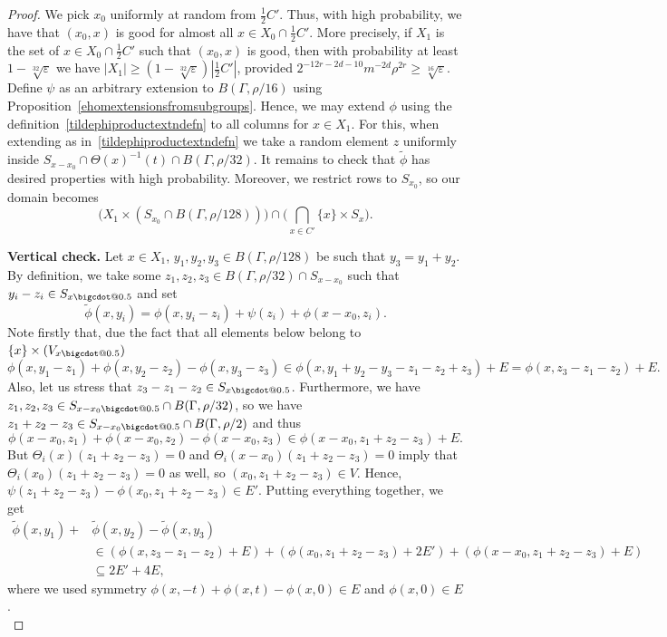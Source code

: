 \documentclass[a4paper,11pt]{article}
\makeatletter
\numberwithin{theorem}{section}
\theoremstyle{definition}
\newcommand*\bcdot{\mathpalette\bigcdot@{0.5}}
\newcommand*\bigcdot@[2]{\mathbin{\vcenter{\hbox{\scalebox{#2}{$\m@th#1\bullet$}}}}}
\makeatother
\begin{document}
\begin{proof}
    We pick $x_0$ uniformly at random from $\frac{1}{2}C'$. Thus, with high probability, we have that $(x_0, x)$ is good for almost all $x\in X_0 \cap \frac{1}{2}C'$. More precisely, if $X_1$ is the set of $x \in X_0 \cap \frac{1}{2}C'$ such that $(x_0, x)$ is good, then with probability at least $1-\sqrt[32]{\varepsilon}$ we have $|X_1| \geq (1 - \sqrt[32]{\varepsilon})|\frac{1}{2}C'|$, provided $2^{-12r - 2d-10}m^{-2d} \rho^{2r} \geq \sqrt[16]{\varepsilon}$. Define $\psi$ as an arbitrary extension to $B(\Gamma, \rho/16)$ using Proposition~\ref{ehomextensionsfromsubgroups}. Hence, we may extend $\phi$ using the definition~\eqref{tildephiproductextndefn} to all columns for $x \in X_1$. For this, when extending as in~\eqref{tildephiproductextndefn} we take a random element $z$ uniformly inside $S_{x - x_0} \cap \Theta(x)^{-1}(t) \cap B(\Gamma, \rho/32)$. It remains to check that $\tilde{\phi}$ has desired properties with high probability. Moreover, we restrict rows to $S_{x_0}$, so our domain becomes
    \[\Big(X_1 \times (S_{x_0} \cap B(\Gamma, \rho/128))\Big) \cap \Big(\bigcap_{x \in C'} \{x\} \times S_x\Big).\]

    \noindent\textbf{Vertical check.} Let $x \in X_1$, $y_1, y_2, y_3 \in B(\Gamma, \rho/128)$ be such that $y_3 = y_1 + y_2$. By definition, we take some $z_1, z_2, z_3 \in B(\Gamma, \rho/32) \cap S_{x - x_0}$ such that $y_i - z_i \in S_{x \bcdot}$ and set
    \[\tilde{\phi}(x, y_i) = \phi(x, y_i - z_i) + \psi(z_i) + \phi(x - x_0, z_i).\]
    Note firstly that, due the fact that all elements below belong to $\{x\} \times (V_{x \bcdot})$
    \[\phi(x, y_1 - z_1) +\phi(x, y_2 - z_2) - \phi(x, y_3 - z_3) \in \phi(x, y_1 + y_2 - y_3 - z_1 - z_2 + z_3) + E = \phi(x, z_3 - z_1 -z_2) + E.\]
    Also, let us stress that $z_3 - z_1 - z_2 \in S_{x \bcdot}$. Furthermore,
    we have $z_1, z_2, z_3 \in S_{x - x_0 \bcdot} \cap B(\Gamma, \rho/32)$, so we have $z_1 + z_2 - z_3 \in S_{x - x_0 \bcdot} \cap B(\Gamma, \rho/2)$ and thus
    \[\phi(x - x_0, z_1) + \phi(x - x_0, z_2) - \phi(x - x_0, z_3) \in \phi(x - x_0, z_1 + z_2 - z_3) + E.\]
    But $\Theta_i(x)(z_1 + z_2 - z_3) = 0$ and $\Theta_i(x - x_0)(z_1 + z_2 - z_3) = 0$ imply that $\Theta_i(x_0)(z_1 + z_2 - z_3) = 0$ as well, so $(x_0, z_1 + z_2 - z_3) \in V$. Hence, $\psi(z_1 + z_2 - z_3) - \phi(x_0, z_1 + z_2 - z_3) \in E'$. Putting everything together, we get
    \begin{align*}\tilde{\phi}(x, y_1) +& \tilde{\phi}(x, y_2) - \tilde{\phi}(x, y_3)\\
    &\in (\phi(x, z_3 - z_1 -z_2) + E) 
    + (\phi(x_0, z_1 + z_2 - z_3) + 2 E') + (\phi(x - x_0, z_1 + z_2 - z_3) + E) \\
    &\subseteq 2E' + 4E,\end{align*}
    where we used symmetry $\phi(x, -t) + \phi(x, t) - \phi(x, 0) \in E$ and $\phi(x, 0) \in E$.\\


\end{proof}
\end{document}
